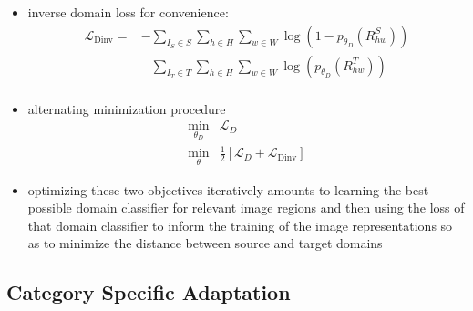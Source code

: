 \documentclass[]{article}
\begin{document}
\begin{itemize}
	\item inverse domain loss for convenience:
	\begin{align}
		\mathcal{L}_{\text{Dinv}} = &- \sum_{I_S \in S} \sum_{h\in H}\sum_{w \in W} \log (1 - p_{\theta_D}(R^S_{hw}))\\
		&- \sum_{I_T \in T} \sum_{h\in H}\sum_{w \in W} \log (p_{\theta_D}(R^T_{hw}))\\
	\end{align}
	\item alternating minimization procedure
	$$\begin{array}{cc}
		\underset{\theta_D}{\min} & \mathcal{L}_D\\
		\underset{\theta}{\min} &\frac{1}{2} [\mathcal{L}_D + \mathcal{L}_{\text{Dinv}}]
	\end{array}$$
	\item optimizing these two objectives iteratively amounts to learning the best possible domain classifier for relevant image regions and then using the loss of that domain classifier to inform the training of the image representations so as to minimize the distance between source and target domains
\end{itemize}

\subsection{Category Specific Adaptation}
\end{document}
